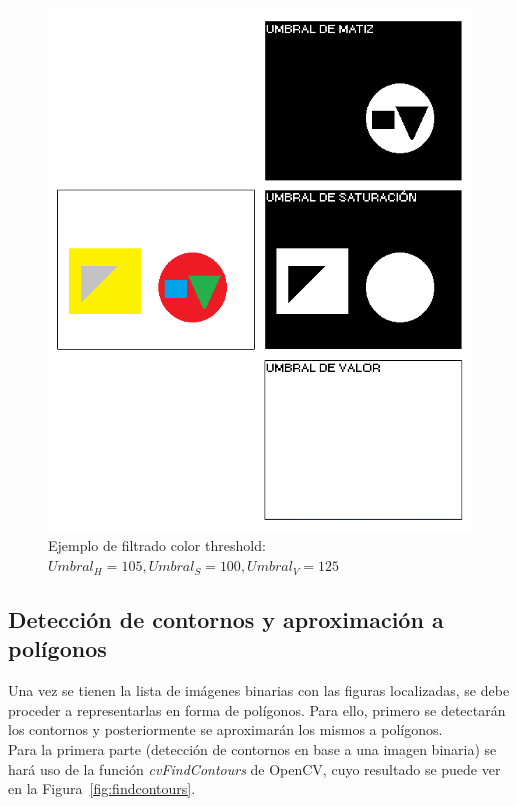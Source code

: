 {		\begin{figure}[!htbp]
		\centering
		\includegraphics[scale=0.47]{graphics/colorthreshold2.png}
		\caption{Ejemplo de filtrado color threshold: $Umbral_{H} = 105, Umbral_{S} = 100, Umbral_{V} = 125$}
		\label{fig:colorthres2}
		\end{figure}
	
	
	
	\subsection{Detección de contornos y aproximación a polígonos}
	\label{sec:deteccionContornos}
	
	Una vez se tienen la lista de imágenes binarias con las figuras localizadas, se debe proceder a representarlas en forma de polígonos. Para ello, primero se detectarán los contornos y posteriormente se aproximarán los mismos a polígonos.\\
	
	Para la primera parte (detección de contornos en base a una imagen binaria) se hará uso de la función \emph{cvFindContours} de OpenCV, cuyo resultado se puede ver en la Figura~\ref{fig:findcontours}.\\
	
}
